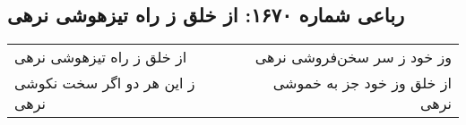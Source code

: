 \begin{center}
\section*{رباعی شماره ۱۶۷۰: از خلق ز راه تیزهوشی نرهی}
\label{sec:1670}
\begin{longtable}{l p{0.5cm} r}
از خلق ز راه تیزهوشی نرهی
&&
وز خود ز سر سخن‌فروشی نرهی
\\
ز این هر دو اگر سخت نکوشی نرهی
&&
از خلق وز خود جز به خموشی نرهی
\\
\end{longtable}
\end{center}
